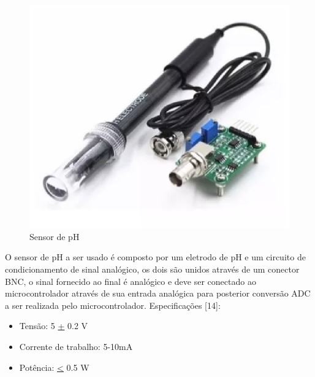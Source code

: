 \begin{figure}[H]
 \centering
   \includegraphics[keepaspectratio=true,scale=0.8]{figuras/sensorph.eps}
 \caption{Sensor de pH}
 \label{sensor_ph}
\end{figure}

O sensor de pH a ser usado é composto por um eletrodo de pH e um circuito de condicionamento de sinal analógico, os dois são unidos através de um conector BNC, o sinal fornecido ao final é analógico e deve ser conectado ao microcontrolador através de sua entrada analógica para posterior conversão ADC a ser realizada pelo microcontrolador. Especificações [14]:
\begin{itemize}
\item Tensão: 5 \underline{+} 0.2 V
\item Corrente de trabalho: 5-10mA
\item Potência: \underline{<} 0.5 W
\end{itemize}


